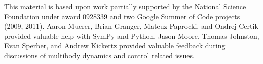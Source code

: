 \documentclass{svjour3}                     %
\begin{document}
\begin{acknowledgements}
  This material is based upon work partially supported by the National Science
  Foundation under award 0928339 and two Google Summer of Code projects (2009,
  2011).  Aaron Muerer, Brian Granger, Mateuz Paprocki, and Ondrej Certik
  provided valuable help with SymPy and Python.  Jason Moore, Thomas Johnston,
  Evan Sperber, and Andrew Kickertz provided valuable feedback during
  discussions of multibody dynamics and control related issues.
\end{acknowledgements}

\end{document}
